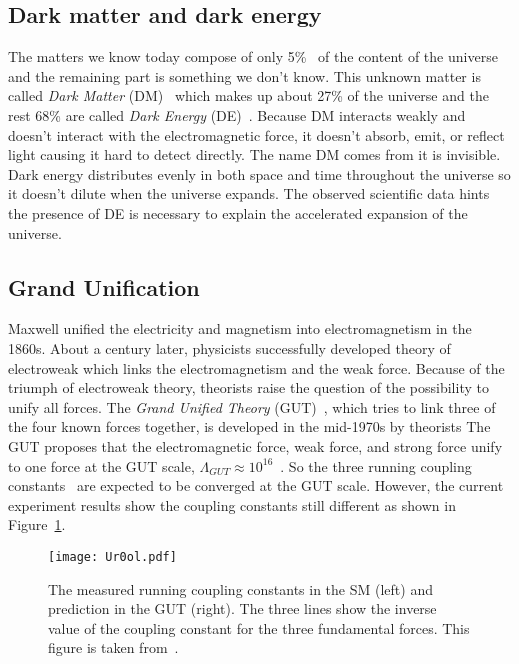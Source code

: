 \subsection{Dark matter and dark energy}
\label{subsec:sm_dm}
The matters we know today compose of only 5\%~\cite{arXiv:1212.5225v3,Ade:2013sjv} of the content of the universe and the remaining part is something we don't know.
This unknown matter is called \textit{Dark Matter} (DM)~\cite{j.physrep.2004.08.031} which makes up about 27\% of the universe and the rest 68\% are called \textit{Dark Energy} (DE)~\cite{arXiv:1212.5225v3,Ade:2013sjv}.
Because DM interacts weakly and doesn't interact with the electromagnetic force, it doesn't absorb, emit, or reflect light causing it hard to detect directly. 
The name DM comes from it is invisible.
Dark energy distributes evenly in both space and time throughout the universe so it doesn't dilute when the universe expands.
The observed scientific data hints the presence of DE is necessary to explain the accelerated expansion of the universe.


\subsection{Grand Unification}
\label{subsec:sm_grand_unification}
Maxwell unified the electricity and magnetism into electromagnetism in the 1860s.
About a century later, physicists successfully developed theory of electroweak which links the electromagnetism and the weak force.
Because of the triumph of electroweak theory, theorists raise the question of the possibility to unify all forces.
The \textit{Grand Unified Theory} (GUT)~\cite{0031-9112-37-10-029}, which tries to link three of the four known forces together, is developed in the mid-1970s by theorists
The GUT proposes that the electromagnetic force, weak force, and strong force unify to one force at the GUT scale, $\Lambda_{GUT} \approx 10^{16}$~{\GeV}.
So the three running coupling constants~\cite{RevModPhys.84.1527} are expected to be converged at the GUT scale.
However, the current experiment results show the coupling constants still different as shown in Figure~\ref{fig:sm_coulping_constants}.

\begin{figure}[htbp]
\begin{center}
\texttt{[image: Ur0ol.pdf]}
\caption{The measured running coupling constants in the SM (left) and prediction in the GUT (right).
The three lines show the inverse value of the coupling constant for the three fundamental forces.
This figure is taken from~\cite{Ur0ol}.
}
\label{fig:sm_coulping_constants}
\end{center}
\end{figure}

